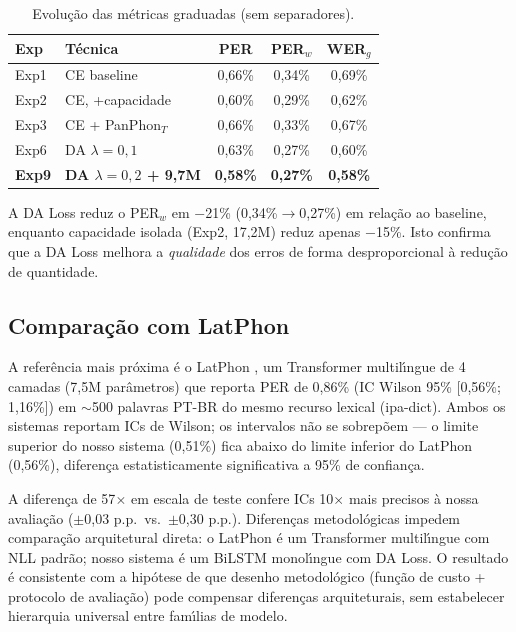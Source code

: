 \documentclass[12pt]{article}
\begin{document}
\begin{table}[ht]
\centering
\caption{Evolu\c{c}\~ao das m\'etricas graduadas (sem separadores).}
\label{tab:graduated}
\begin{tabular}{llccc}
\toprule
\textbf{Exp} & \textbf{T\'ecnica} & \textbf{PER}
  & \textbf{PER$_w$} & \textbf{WER$_g$} \\
\midrule
Exp1 & CE baseline  & 0,66\% & 0,34\% & 0,69\% \\
Exp2 & CE, +capacidade & 0,60\% & 0,29\% & 0,62\% \\
Exp3 & CE + PanPhon$_T$ & 0,66\% & 0,33\% & 0,67\% \\
Exp6 & DA $\lambda{=}0{,}1$ & 0,63\% & 0,27\% & 0,60\% \\
\textbf{Exp9} & \textbf{DA $\lambda{=}0{,}2$ + 9,7M}
  & \textbf{0,58\%} & \textbf{0,27\%} & \textbf{0,58\%} \\
\bottomrule
\end{tabular}
\end{table}

A DA Loss reduz o PER$_w$ em $-$21\% (0,34\%$\to$0,27\%) em rela\c{c}\~ao
ao baseline, enquanto capacidade isolada (Exp2, 17,2M) reduz apenas
$-$15\%. Isto confirma que a DA Loss melhora a \emph{qualidade} dos erros
de forma desproporcional \`a redu\c{c}\~ao de quantidade.

\subsection{Compara\c{c}\~ao com LatPhon}

A refer\^encia mais pr\'oxima \'e o LatPhon \cite{chary2025latphon},
um Transformer multil\'{\i}ngue de 4 camadas (7,5M par\^ametros) que
reporta PER de 0,86\% (IC Wilson 95\% [0,56\%; 1,16\%]) em ${\sim}$500
palavras PT-BR do mesmo recurso lexical (ipa-dict). Ambos os sistemas
reportam ICs de Wilson; os intervalos n\~ao se sobrep\~oem --- o limite
superior do nosso sistema (0,51\%) fica abaixo do limite inferior do
LatPhon (0,56\%), diferen\c{c}a estatisticamente significativa a 95\%
de confian\c{c}a.

A diferen\c{c}a de 57$\times$ em escala de teste confere ICs
10$\times$ mais precisos \`a nossa avalia\c{c}\~ao ($\pm$0,03 p.p.\
vs.\ $\pm$0,30 p.p.). Diferen\c{c}as metodol\'ogicas impedem
compara\c{c}\~ao arquitetural direta: o LatPhon \'e um Transformer
multil\'{\i}ngue com NLL padr\~ao; nosso sistema \'e um BiLSTM
monol\'{\i}ngue com DA Loss. O resultado \'e consistente com a
hip\'otese de que desenho metodol\'ogico (fun\c{c}\~ao de custo +
protocolo de avalia\c{c}\~ao) pode compensar diferen\c{c}as
arquiteturais, sem estabelecer hierarquia universal entre fam\'{\i}lias
de modelo.
\end{document}

